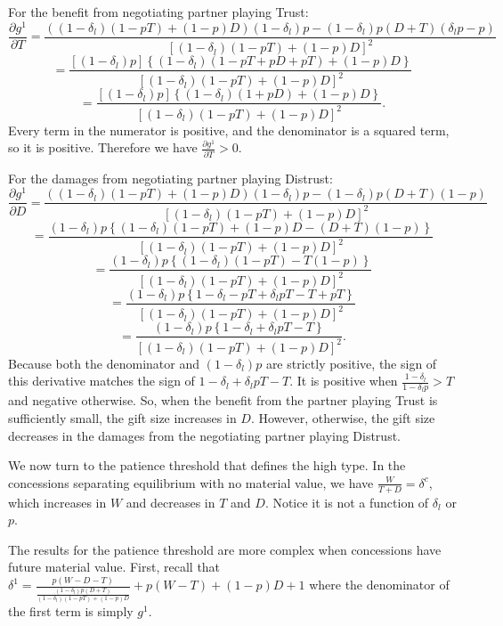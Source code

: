 \documentclass[bibtex,autowc]{apsr_submission}
\newcommand{\de}{\delta}
\begin{document}
{For the benefit from negotiating partner playing Trust: 
$$\frac{\partial g^1}{\partial T} = \frac{\left(\left(1-\de_l\right)\left(1 - pT \right) + (1-p) D\right)(1-\de_l)p - \left(1-\de_l\right)p\left(D + T\right)(\de_l p -p)}{\left[\left(1-\de_l\right)\left(1 - pT \right) + (1-p) D\right]^2}$$
$$= \frac{\left[(1-\de_l)p\right] \left\{\left(1-\de_l\right)\left(1 - pT + pD + pT\right) + (1-p) D\right\}}{\left[\left(1-\de_l\right)\left(1 - pT \right) + (1-p) D\right]^2}$$
$$= \frac{\left[(1-\de_l)p\right] \left\{\left(1-\de_l\right)\left(1 + pD \right) + (1-p) D\right\}}{\left[\left(1-\de_l\right)\left(1 - pT \right) + (1-p) D\right]^2}.$$ Every term in the numerator is positive, and the denominator is a squared term, so it is positive. Therefore we have $\frac{\partial g^1}{\partial T} > 0$.

For the damages from negotiating partner playing Distrust: $$\frac{\partial g^1}{\partial D} = \frac{\left(\left(1-\de_l\right)\left(1 - pT \right) + (1-p) D\right)(1-\de_l)p - \left(1-\de_l\right)p\left(D + T\right)(1 -p)}{\left[\left(1-\de_l\right)\left(1 - pT \right) + (1-p) D\right]^2}$$
$$= \frac{(1-\de_l)p\left\{\left(1-\de_l\right)\left(1 - pT \right) + (1-p) D - \left(D + T\right)(1 -p)\right\}}{\left[\left(1-\de_l\right)\left(1 - pT \right) + (1-p) D\right]^2}$$
$$= \frac{(1-\de_l)p\left\{\left(1-\de_l\right)\left(1 - pT \right) - T(1 -p)\right\}}{\left[\left(1-\de_l\right)\left(1 - pT \right) + (1-p) D\right]^2}$$
$$= \frac{(1-\de_l)p\left\{1-\de_l -pT + \de_l p T - T +pT\right\}}{\left[\left(1-\de_l\right)\left(1 - pT \right) + (1-p) D\right]^2}$$
$$= \frac{(1-\de_l)p\left\{1-\de_l + \de_l p T - T\right\}}{\left[\left(1-\de_l\right)\left(1 - pT \right) + (1-p) D\right]^2}.$$ Because both the denominator and $(1-\de_l)p$ are strictly positive, the sign of this derivative matches the sign of $1-\de_l + \de_l p T - T$. It is positive when $\frac{1-\de_l}{1-\de_l p} > T$ and negative otherwise. So, when the benefit from the partner playing Trust is sufficiently small, the gift size increases in $D$. However, otherwise, the gift size decreases in the damages from the negotiating partner playing Distrust.

We now turn to the patience threshold that defines the high type. In the {concessions separating equilibrium} with no material value, we have $\frac{W}{T+D} = \de^{c}$, which increases in $W$ and decreases in $T$ and $D$. Notice it is not a function of $\delta_l$ or $p$.

The results for the patience threshold are more complex when concessions have future material value. First, recall that $\de^1 = \frac{p(W-D-T)}{\frac{\left(1-\de_l\right)p\left(D +	 T\right)}{\left(1-\de_l\right)\left(1 - pT \right) + (1-p) D}} + p (W-T) + (1-p)D + 1$ where the denominator of the first term is simply $g^1$.

}
\end{document}
